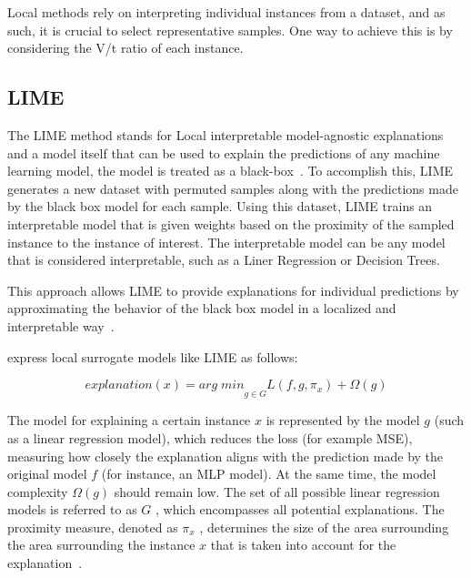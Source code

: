 Local methods rely on interpreting individual instances from a dataset, and as such, it is
crucial to select representative samples.
One way to achieve this is by considering the V/t ratio of each instance.

\subsection{LIME}\label{subsec:lime}
The LIME method stands for Local interpretable model-agnostic explanations
and a model itself that can be used to explain the predictions of any machine
learning model, the model is treated as a black-box~\cite{ribeiro2016model}.
To accomplish this, LIME generates a new dataset with permuted samples along with the predictions
made by the black box model for each sample.
Using this dataset, LIME trains an interpretable model that is given weights based on the
proximity of the sampled instance to the instance of interest.
The interpretable model can be any model that is considered interpretable, such as a Liner
Regression or Decision Trees.

This approach allows LIME to provide explanations for individual predictions by approximating the
behavior of the black box model in a localized and interpretable way~\cite[p. 185]{
    molnar2020interpretable}.

\cite{molnar2020interpretable} express local surrogate models like LIME as follows:

\begin{tcolorbox}[arc=0pt,boxrule=0.5pt]
    \begin{equation}
        explanation(x) = arg\; min\underset{g \in G}\; L(f,g,\pi_x) + \Omega(g)
    \end{equation}
\end{tcolorbox}

The model for explaining a certain instance $x$ is represented by the model $g$ (such as a
linear regression model), which reduces the loss (for example \ac{MSE}), measuring how closely
the explanation aligns with the prediction made by the original model $f$ (for instance, an
\ac{MLP} model).
At the same time, the model complexity $\Omega(g)$ should remain low.
The set of all possible linear regression models is referred to as $G$ , which encompasses all
potential explanations.
The proximity measure, denoted as $\pi_x$ , determines the size of the area surrounding the area
surrounding the instance $x$ that is taken into account for the
explanation~\cite[p. 185]{molnar2020interpretable}.

